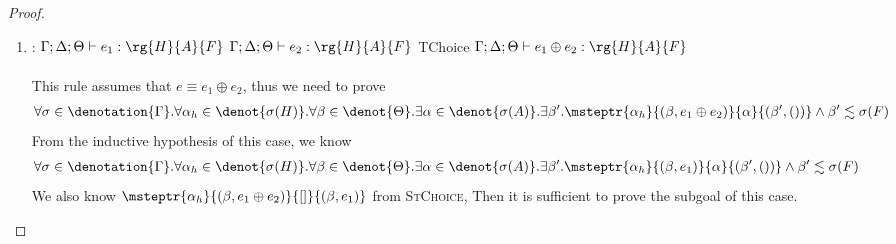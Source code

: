 \begin{proof}
\begin{enumerate}[label=Case]
\item:
{\footnotesize
\mprooftr{50mm}
{
$\Gamma; \Delta; \Theta \vdash e_1 : \rg{H}{A}{F}$ \quad $\Gamma; \Delta; \Theta \vdash e_2 : \rg{H}{A}{F}$
 }
{TChoice}
{$\Gamma; \Delta; \Theta \vdash e_1 \oplus e_2 : \rg{H}{A}{F}$}
\ \\ \ \\}
This rule assumes that $e \equiv e_1 \oplus e_2$, thus we need to prove
{\footnotesize\begin{align*}
\forall \sigma \in
    \denotation{\Gamma}. \forall \alpha_h \in \denot{\sigma(H)}.\forall \beta \in \denot{\Theta}. \exists \alpha \in \denot{\sigma(A)}.\exists \beta'. \msteptr{\alpha_h}{(\beta, e_1 \oplus e_2)}{\alpha}{(\beta', ())} \land \beta' \realz \sigma(F)
\end{align*}}\noindent
From the inductive hypothesis of this case, we know
{\footnotesize\begin{align*}
    & \forall \sigma \in
    \denotation{\Gamma}. \forall \alpha_h \in \denot{\sigma(H)}.\forall \beta \in \denot{\Theta}. \exists \alpha \in \denot{\sigma(A)}.\exists \beta'. \msteptr{\alpha_h}{(\beta, e_1)}{\alpha}{(\beta', ())} \land \beta' \realz \sigma(F)
\end{align*}}\noindent
We also know $\msteptr{\alpha_h}{(\beta, e_1 \oplus e_2)}{[]}{(\beta, e_1)}$ from \textsc{StChoice}, Then it is sufficient to prove the subgoal of this case.


\end{enumerate}
\end{proof}
